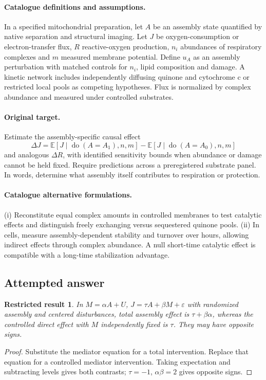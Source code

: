 \documentclass[11pt]{article}
\newcommand{\E}{\mathbb E}
\providecommand{\E}{\mathbb E}
\newtheorem{attemptresult}{Restricted result}[section]
\begin{document}
\paragraph{Catalogue definitions and assumptions.}
In a specified mitochondrial preparation, let $A$ be an assembly state quantified by native separation and structural imaging. Let $J$ be oxygen-consumption or electron-transfer flux, $R$ reactive-oxygen production, $n_i$ abundances of respiratory complexes and $m$ measured membrane potential. Define $u_A$ as an assembly perturbation with matched controls for $n_i$, lipid composition and damage. A kinetic network includes independently diffusing quinone and cytochrome c or restricted local pools as competing hypotheses. Flux is normalized by complex abundance and measured under controlled substrates.
\paragraph{Original target.}
Estimate the assembly-specific causal effect
\[
\Delta J=\E[J\mid\operatorname{do}(A=A_1),n,m]-\E[J\mid\operatorname{do}(A=A_0),n,m]
\]
and analogous $\Delta R$, with identified sensitivity bounds when abundance or damage cannot be held fixed. Require predictions across a preregistered substrate panel. In words, determine what assembly itself contributes to respiration or protection.
\paragraph{Catalogue alternative formulations.}
(i) Reconstitute equal complex amounts in controlled membranes to test catalytic effects and distinguish freely exchanging versus sequestered quinone pools. (ii) In cells, measure assembly-dependent stability and turnover over hours, allowing indirect effects through complex abundance. A null short-time catalytic effect is compatible with a long-time stabilization advantage.
\subsection{Attempted answer}
\begin{attemptresult}
In $M=\alpha A+U$, $J=\tau A+\beta M+\varepsilon$ with randomized assembly and centered disturbances, total assembly effect is $\tau+\beta\alpha$, whereas the controlled direct effect with $M$ independently fixed is $\tau$. They may have opposite signs.
\end{attemptresult}
\begin{proof}
Substitute the mediator equation for a total intervention. Replace that equation for a controlled mediator intervention. Taking expectation and subtracting levels gives both contrasts; $\tau=-1$, $\alpha\beta=2$ gives opposite signs.
\end{proof}
\end{document}
